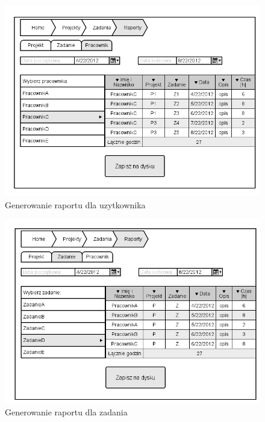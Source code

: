 \begin{figure}[H]
    \centering
    \includegraphics[scale=0.7]{diagramy/intefejsy/Generowanie_raportu_dla_uzytkownika.png}
    \caption{Generowanie raportu dla uzytkownika}
    \label{fig:usecase}
\end{figure}

\begin{figure}[H]
    \centering
    \includegraphics[scale=0.7]{diagramy/intefejsy/Generowanie_raportu_dla_zadania.png}
    \caption{Generowanie raportu dla zadania}
    \label{fig:usecase}
\end{figure}

